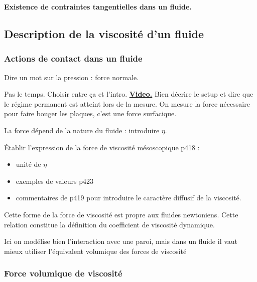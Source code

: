 \begin{slide}
\textbf{Existence de contraintes tangentielles dans un fluide.}
\end{slide}

\subsection{Description de la viscosité d'un fluide}

\subsubsection{Actions de contact dans un fluide}

Dire un mot sur la pression : force normale.

\begin{slide}
Pas le temps. Choisir entre ça et l'intro.
\href{https://youtu.be/pqWwHxn6LNo?t=213}{\textbf{Video.}}
Bien décrire le setup et dire que le régime permanent est atteint lors de la mesure.
On mesure la force nécessaire pour faire bouger les plaques, c'est une force surfacique.
\end{slide}
La force dépend de la nature du fluide : introduire $\eta$.

Établir l'expression de la force de viscosité mésoscopique \cite{Olivier2000} p418 :
\begin{itemize}
\item unité de $\eta$
\item exemples de valeurs \cite{Olivier2000} p423
\item commentaires de \cite{Olivier2000} p419 pour introduire le caractère diffusif de la viscosité.
\end{itemize}

\begin{remarque}
Cette forme de la force de viscosité est propre aux fluides newtoniens.
Cette relation constitue la définition du coefficient de viscosité dynamique.
\end{remarque}

\begin{transition}
Ici on modélise bien l'interaction avec une paroi, mais dans un fluide il vaut mieux utiliser l'équivalent volumique des forces de viscosité 
\end{transition}

\subsubsection{Force volumique de viscosité}

